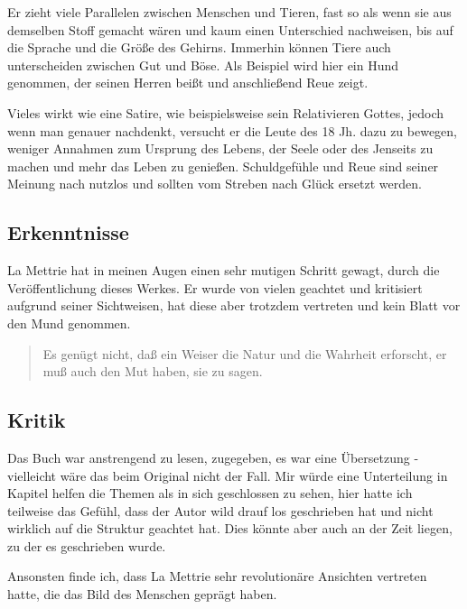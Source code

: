 \documentclass[twoside, a4paper, DIV=11, open=any, bibliography=totoc]{scrbook}
\newcommand{\Quote}[1]{\glqq #1\grqq{}}
\begin{document}
\par
Er zieht viele Parallelen zwischen Menschen und Tieren, fast so als wenn sie aus demselben Stoff gemacht wären und kaum einen Unterschied nachweisen, bis auf die Sprache und die Größe des Gehirns. Immerhin können Tiere auch unterscheiden zwischen \Quote{Gut} und \Quote{Böse}. Als Beispiel wird hier ein Hund genommen, der seinen Herren beißt und anschließend Reue zeigt.  
\par
Vieles wirkt wie eine Satire, wie beispielsweise sein Relativieren Gottes, jedoch wenn man genauer nachdenkt, versucht er die Leute des 18 Jh. dazu zu bewegen, weniger Annahmen zum Ursprung des Lebens, der Seele oder des Jenseits zu machen und mehr das Leben zu genießen. Schuldgefühle und Reue sind seiner Meinung nach nutzlos und sollten vom Streben nach Glück ersetzt werden.  

\subsection{Erkenntnisse} \label{sec:literkenntnis2}

La Mettrie hat in meinen Augen einen sehr mutigen Schritt gewagt, durch die Veröffentlichung dieses Werkes. Er wurde von vielen geachtet und kritisiert aufgrund seiner Sichtweisen, hat diese aber trotzdem vertreten und kein Blatt vor den Mund genommen.  

\begin{quote}
    \Quote{Es genügt nicht, daß ein Weiser die Natur und die Wahrheit erforscht, er muß auch den Mut haben, sie zu sagen.}
\end{quote}

\subsection{Kritik} \label{sec:litkritik2}
Das Buch war anstrengend zu lesen, zugegeben, es war eine Übersetzung - vielleicht wäre das beim Original nicht der Fall. Mir würde eine Unterteilung in Kapitel helfen die Themen als in sich geschlossen zu sehen, hier hatte ich teilweise das Gefühl, dass der Autor \Quote{wild drauf los geschrieben hat} und nicht wirklich auf die Struktur geachtet hat. Dies könnte aber auch an der Zeit liegen, zu der es geschrieben wurde.  
\par
Ansonsten finde ich, dass La Mettrie sehr revolutionäre Ansichten vertreten hatte, die das Bild des Menschen geprägt haben. 
\end{document}
